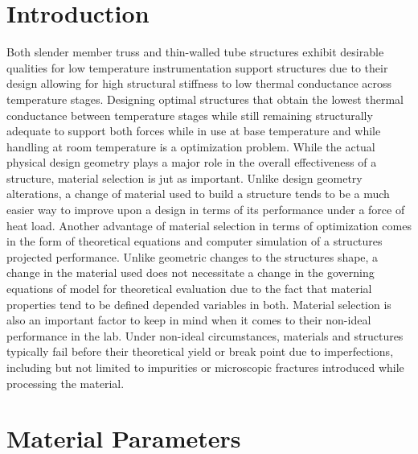 \documentclass[final]{svjour2}
\begin{document}
\section{Introduction}
Both slender member truss and thin-walled tube structures exhibit desirable qualities for low temperature instrumentation support structures due to their design allowing for high structural stiffness to low thermal conductance across temperature stages.  Designing optimal structures that obtain the lowest thermal conductance between temperature stages while still remaining structurally adequate to support both forces while in use at base temperature and while handling at room temperature is a optimization problem.  While the actual physical design geometry plays a major role in the overall effectiveness of a structure, material selection is jut as important.  Unlike design geometry alterations, a change of material used to build a structure tends to be a much easier way to improve upon a design in terms of its performance under a force of heat load. Another advantage of material selection in terms of optimization comes in the form of theoretical equations and computer simulation of a structures projected performance.  Unlike geometric changes to the structures shape, a change in the material used does not necessitate a change in the governing equations of model for theoretical evaluation due to the fact that material properties tend to be defined depended variables in both.  Material selection is also an important factor to keep in mind when it comes to their non-ideal performance in the lab. Under non-ideal circumstances, materials and structures typically fail before their theoretical yield or break point due to imperfections, including but not limited to impurities or microscopic fractures introduced while processing the material.

\section{Material Parameters}
\end{document}

